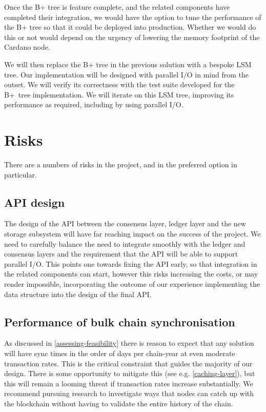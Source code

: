 \documentclass[11pt,a4paper]{article}
\begin{document}
Once the B+ tree is feature complete, and the related components have completed
their integration, we would have the option to tune the performance of the
B+ tree so that it could be deployed into production. Whether we would do this
or not would depend on the urgency of lowering the memory footprint of the
Cardano node.

We will then replace the B+ tree in the previous solution with a bespoke LSM
tree. Our implementation will be designed with parallel I/O in mind from the
outset. We will verify its correctness with the test suite developed for the
B+~tree implementation. We will iterate on this LSM tree, improving its
performance as required, including by using parallel I/O.

\section{Risks}

There are a numbers of risks in the project, and in the preferred option in
particular.

\subsection{API design}
The design of the API between the consensus layer, ledger layer and the new
storage subsystem will have far reaching impact on the success of the project.
We need to carefully balance the need to integrate smoothly with the ledger
and consensus layers and the requirement that the API will be able to support
parallel I/O. This points one towards fixing the API early, so that integration
in the related components can start, however this risks increasing the costs,
or may render impossible, incorporating the outcome of our experience
implementing the data structure into the design of the final API.

\subsection{Performance of bulk chain synchronisation}
As discussed in \cref{assessing-feasibility} there is reason to expect that any
solution will have sync times in the order of days per chain-year at even
moderate transaction rates. This is the critical constraint that guides the
majority of our design. There is some opportunity to mitigate this (see e.g.
\cref{caching-layer}), but this will remain a looming threat if transaction
rates increase substantially. We recommend pursuing research to investigate
ways that nodes can catch up with the blockchain without having to validate the
entire history of the chain.



\end{document}
